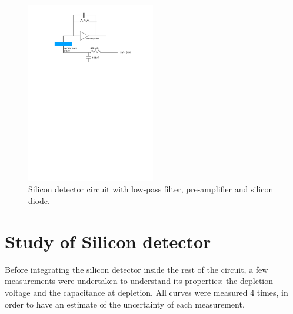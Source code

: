 \documentclass[12pt]{article}
\begin{document}
\begin{figure}[htb]
  \centering
  \includegraphics[width=0.5\textwidth]{./graphics/SiliconDiodeCircuit}
  \caption{Silicon detector circuit with low-pass filter, pre-amplifier and silicon diode.}
  \label{fig:SiliconDiodeCircuit}
\end{figure}





\section{Study of Silicon detector}

Before integrating the silicon detector inside the rest of the circuit, a few measurements were undertaken to understand its properties: the depletion voltage and the capacitance at depletion. All curves were measured $4$ times, in order to have an estimate of the uncertainty of each measurement.
\end{document}
